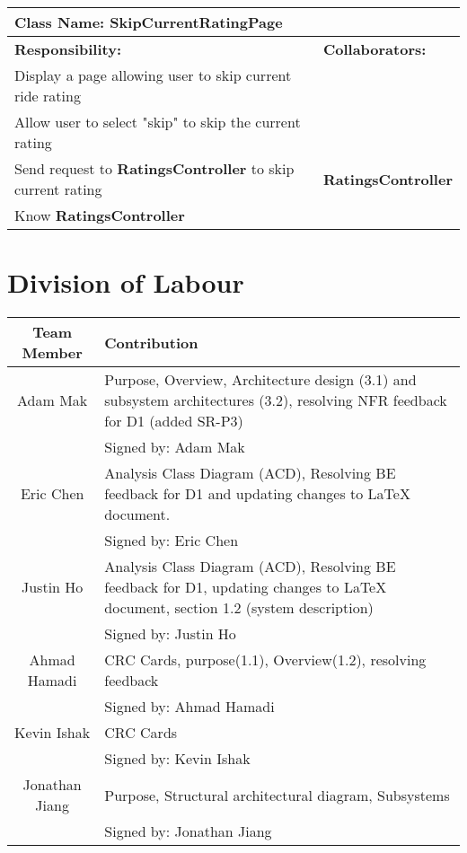 \documentclass[]{article}
\begin{document}
\begin{table}[H]
    \centering
    \begin{tabular}{|p{5cm}|p{5cm}|}
    \hline
    \multicolumn{2}{|l|}{\textbf{Class Name:} SkipCurrentRatingPage} \\
    \hline
    \textbf{Responsibility:} & \textbf{Collaborators:} \\
    \hline
    Display a page allowing user to skip current ride rating & \phantom{} \\
    \hline
    Allow user to select "skip" to skip the current rating & \phantom{} \\
    \hline
    Send request to \textbf{RatingsController} to skip current rating & \textbf{RatingsController} \\
    \hline
     Know \textbf{RatingsController}  & \phantom{} \\
    \hline
    \end{tabular}
\end{table}



    

\appendix
\section{Division of Labour}
\label{sec:division_of_labour}
\begin{center} \begin{tabular} {|c|p{35em}|}
	\hline
	\textbf{Team Member} & \textbf{Contribution} \\
	\hline \hline
	Adam Mak & Purpose, Overview, Architecture design (3.1) and subsystem architectures (3.2), resolving NFR feedback for D1 (added SR-P3)\\
	& Signed by: Adam Mak\\
	\hline
	Eric Chen & Analysis Class Diagram (ACD), Resolving BE feedback for D1 and updating changes to LaTeX document.\\
	& Signed by: Eric Chen\\
	\hline
	Justin Ho & Analysis Class Diagram (ACD), Resolving BE feedback for D1, updating changes to LaTeX document, section 1.2 (system description)\\
	& Signed by: Justin Ho\\
	\hline
	Ahmad Hamadi & CRC Cards, purpose(1.1), Overview(1.2), resolving feedback\\
	& Signed by: Ahmad Hamadi \\
	\hline
	Kevin Ishak & CRC Cards \\
	& Signed by: Kevin Ishak \\
	\hline
	Jonathan Jiang & Purpose, Structural architectural diagram, Subsystems\\
	& Signed by: Jonathan Jiang\\
	\hline
\end{tabular} \end{center}
\end{document}
